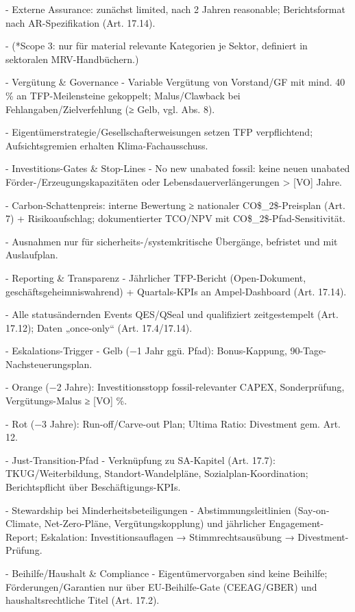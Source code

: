 \documentclass[12pt,a4paper]{scrartcl}
\begin{document}
- Externe Assurance: zunächst limited, nach 2 Jahren reasonable; Berichtsformat nach AR-Spezifikation (Art. 17.14).

- (*Scope 3: nur für material relevante Kategorien je Sektor, definiert in sektoralen MRV-Handbüchern.)

- Vergütung \& Governance
- Variable Vergütung von Vorstand/GF mit mind. 40 \% an TFP-Meilensteine gekoppelt; Malus/Clawback bei Fehlangaben/Zielverfehlung (≥ Gelb, vgl. Abs. 8).

- Eigentümerstrategie/Gesellschafterweisungen setzen TFP verpflichtend; Aufsichtsgremien erhalten Klima-Fachausschuss.

- Investitions-Gates \& Stop-Lines
- No new unabated fossil: keine neuen unabated Förder-/Erzeugungskapazitäten oder Lebensdauerverlängerungen > [VO] Jahre.

- Carbon-Schattenpreis: interne Bewertung ≥ nationaler CO\$\_2\$-Preisplan (Art. 7) + Risikoaufschlag; dokumentierter TCO/NPV mit CO\$\_2\$-Pfad-Sensitivität.

- Ausnahmen nur für sicherheits-/systemkritische Übergänge, befristet und mit Auslaufplan.

- Reporting \& Transparenz
- Jährlicher TFP-Bericht (Open-Dokument, geschäftsgeheimniswahrend) + Quartals-KPIs an Ampel-Dashboard (Art. 17.14).

- Alle statusändernden Events QES/QSeal und qualifiziert zeitgestempelt (Art. 17.12); Daten „once-only“ (Art. 17.4/17.14).

- Eskalations-Trigger
- Gelb (−1 Jahr ggü. Pfad): Bonus-Kappung, 90-Tage-Nachsteuerungsplan.

- Orange (−2 Jahre): Investitionsstopp fossil-relevanter CAPEX, Sonderprüfung, Vergütungs-Malus ≥ [VO] \%.

- Rot (−3 Jahre): Run-off/Carve-out Plan; Ultima Ratio: Divestment gem. Art. 12.

- Just-Transition-Pfad
- Verknüpfung zu SA-Kapitel (Art. 17.7): TKUG/Weiterbildung, Standort-Wandelpläne, Sozialplan-Koordination; Berichtspflicht über Beschäftigungs-KPIs.

- Stewardship bei Minderheitsbeteiligungen
- Abstimmungsleitlinien (Say-on-Climate, Net-Zero-Pläne, Vergütungskopplung) und jährlicher Engagement-Report; Eskalation: Investitionsauflagen → Stimmrechtsausübung → Divestment-Prüfung.

- Beihilfe/Haushalt \& Compliance
- Eigentümervorgaben sind keine Beihilfe; Förderungen/Garantien nur über EU-Beihilfe-Gate (CEEAG/GBER) und haushaltsrechtliche Titel (Art. 17.2).
\end{document}
